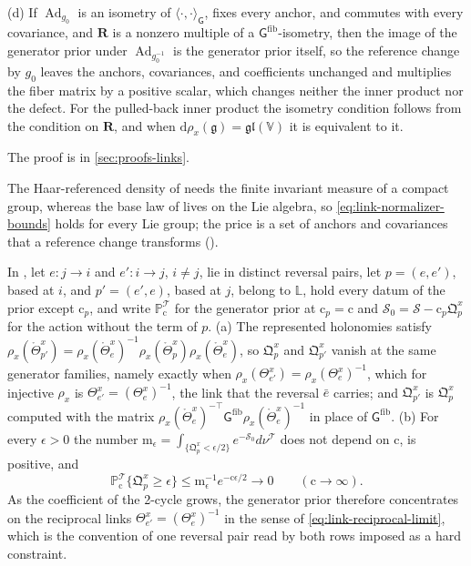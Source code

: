 (d) If $\operatorname{Ad}_{g_0}$ is an isometry of $\langle\cdot,\cdot\rangle_{\mathsf G}$, fixes every
anchor, and commutes with every covariance, and $\mathbf R$ is a nonzero multiple of a
$\mathsf G^{\mathrm{fib}}$-isometry, then the image of the generator prior under
$\operatorname{Ad}_{g_0^{-1}}$ is the generator prior itself, so the reference change by $g_0$ leaves the
anchors, covariances, and coefficients unchanged and multiplies the fiber matrix by a positive scalar,
which changes neither the inner product nor the defect. For the pulled-back inner product the isometry
condition follows from the condition on $\mathbf R$, and when $\mathrm d\rho_x(\mathfrak g)=\mathfrak{gl}(\mathbb V)$
it is equivalent to it. 

The proof is in \cref{sec:proofs-links}.

The Haar-referenced density of  needs the finite invariant measure of a
compact group, whereas the base law of  lives on the Lie algebra, so
\cref{eq:link-normalizer-bounds} holds for every Lie group; the price is a set of anchors and covariances
that a reference change transforms ().

In , let $e:j\to i$ and $e':i\to j$, $i\neq j$, lie in distinct reversal
pairs, let $p=(e,e')$, based at $i$, and $p'=(e',e)$, based at $j$, belong to $\mathbb L$, hold every datum
of the prior except $\mathrm c_p$, and write $\mathbb P^{\mathscr T}_{\mathrm c}$ for the generator prior at
$\mathrm c_p=\mathrm c$ and $\mathscr S_0=\mathscr S-\mathrm c_p\mathfrak Q^x_p$ for the action without
the term of $p$. (a) The represented holonomies satisfy
$\rho_x(\mathring\Theta^x_{p'})=\rho_x(\mathring\Theta^x_e)^{-1}\rho_x(\mathring\Theta^x_p)\rho_x(\mathring\Theta^x_e)$, so
$\mathfrak Q^x_p$ and $\mathfrak Q^x_{p'}$ vanish at the same generator families, namely exactly when
$\rho_x(\Theta^x_{e'})=\rho_x(\Theta^x_e)^{-1}$, which for injective $\rho_x$ is
$\Theta^x_{e'}=(\Theta^x_e)^{-1}$, the link that the reversal $\bar e$ carries; and $\mathfrak Q^x_{p'}$ is
$\mathfrak Q^x_p$ computed with the matrix
$\rho_x(\mathring\Theta^x_e)^{-\top}\mathsf G^{\mathrm{fib}}\rho_x(\mathring\Theta^x_e)^{-1}$ in place of
$\mathsf G^{\mathrm{fib}}$. (b) For every $\epsilon>0$ the number
$\mathrm m_\epsilon=\int_{\{\mathfrak Q^x_p<\epsilon/2\}}e^{-\mathscr S_0}d\nu^{\mathscr T}$
does not depend on $\mathrm c$, is positive, and
\begin{equation}
\mathbb P^{\mathscr T}_{\mathrm c}\bigl\{\mathfrak Q^x_p\geq\epsilon\bigr\}\leq\mathrm m_\epsilon^{-1}e^{-\mathrm c\epsilon/2}
\longrightarrow0
\qquad(\mathrm c\to\infty).
\label{eq:link-reciprocal-limit}
\end{equation}
As the coefficient of the 2-cycle grows, the generator prior therefore concentrates on the reciprocal
links $\Theta^x_{e'}=(\Theta^x_e)^{-1}$ in the sense of \eqref{eq:link-reciprocal-limit}, which is the
convention of one reversal pair read by both rows imposed as a hard constraint. 

